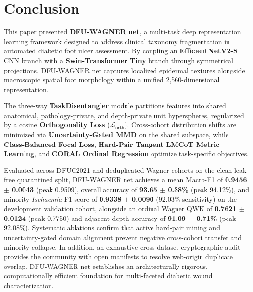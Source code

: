 \documentclass[journal]{IEEEtran}
\begin{document}
\section{Conclusion}
This paper presented \textbf{DFU-WAGNER net}, a multi-task deep representation learning framework designed to address clinical taxonomy fragmentation in automated diabetic foot ulcer assessment. By coupling an \textbf{EfficientNetV2-S} CNN branch with a \textbf{Swin-Transformer Tiny} branch through symmetrical projections, DFU-WAGNER net captures localized epidermal textures alongside macroscopic spatial foot morphology within a unified 2,560-dimensional representation. 

The three-way \textbf{TaskDisentangler} module partitions features into shared anatomical, pathology-private, and depth-private unit hyperspheres, regularized by a cosine \textbf{Orthogonality Loss} ($\mathcal{L}_{\text{orth}}$). Cross-cohort distribution shifts are minimized via \textbf{Uncertainty-Gated MMD} on the shared subspace, while \textbf{Class-Balanced Focal Loss}, \textbf{Hard-Pair Tangent LMCoT Metric Learning}, and \textbf{CORAL Ordinal Regression} optimize task-specific objectives. 

Evaluated across DFUC2021 and deduplicated Wagner cohorts on the clean leak-free quarantined split, DFU-WAGNER net achieves a mean Macro-F1 of \textbf{0.9456 $\pm$ 0.0043} (peak 0.9509), overall accuracy of \textbf{93.65 $\pm$ 0.38\%} (peak 94.12\%), and minority \textit{Ischaemia} F1-score of \textbf{0.9338 $\pm$ 0.0090} (92.03\% sensitivity) on the development validation cohort, alongside an ordinal Wagner QWK of \textbf{0.7621 $\pm$ 0.0124} (peak 0.7750) and adjacent depth accuracy of \textbf{91.09 $\pm$ 0.71\%} (peak 92.08\%). Systematic ablations confirm that active hard-pair mining and uncertainty-gated domain alignment prevent negative cross-cohort transfer and minority collapse. In addition, an exhaustive cross-dataset cryptographic audit provides the community with open manifests to resolve web-origin duplicate overlap. DFU-WAGNER net establishes an architecturally rigorous, computationally efficient foundation for multi-faceted diabetic wound characterization.



\end{document}
